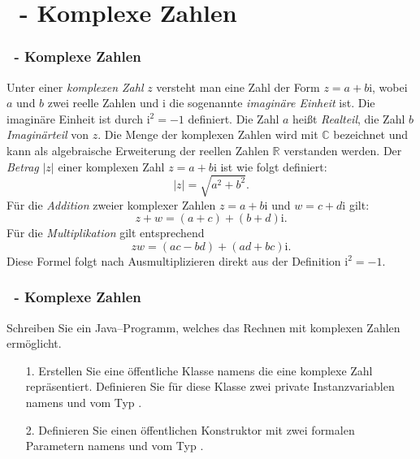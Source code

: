 \def\stitle{\theexercise\ - Komplexe Zahlen}
\section{\stitle}
\begin{frame}%
  \frametitle{\stitle}%

Unter einer \emph{komplexen Zahl} $z$ versteht man eine Zahl der Form $z = a + b\mathrm{i}$, wobei $a$ und $b$ zwei reelle Zahlen und $\mathrm{i}$ die sogenannte \emph{imagin\"are Einheit} ist.
Die imagin\"are Einheit ist durch $\mathrm{i}^2 = -1$ definiert.
Die Zahl $a$ hei\ss t \emph{Realteil}, die Zahl $b$ \emph{Imagin\"arteil} von $z$.
Die Menge der komplexen Zahlen wird mit $\mathbb{C}$ bezeichnet und kann als algebraische Erweiterung der reellen Zahlen $\mathbb{R}$ verstanden werden.
Der \emph{Betrag} $\lvert z\rvert$ einer komplexen Zahl $z = a + b\mathrm{i}$ ist wie folgt definiert:
\begin{equation*}
\lvert z \rvert = \sqrt{a^2 + b^2}.
\end{equation*}
F\"ur die \emph{Addition} zweier komplexer Zahlen $z = a + b\mathrm{i}$ und $w = c + d\mathrm{i}$ gilt:
\begin{equation*}
z + w =(a+c) + (b+d)\mathrm{i}.
\end{equation*}
F\"ur die \emph{Multiplikation} gilt entsprechend
\begin{equation*}
z w =(ac - bd) + (ad + bc)\mathrm{i}.
\end{equation*}
Diese Formel folgt nach Ausmultiplizieren direkt aus der Definition $\mathrm{i}^2 = -1$.
\end{frame}


\begin{frame}%
  \frametitle{\stitle}%
Schreiben Sie ein Java--Programm, welches das Rechnen mit komplexen Zahlen erm\"oglicht.
\begin{enumerate}
\item[1.]
  Erstellen Sie eine \"offentliche Klasse namens  die eine komplexe Zahl repr\"asentiert.
  Definieren Sie f\"ur diese Klasse zwei private Instanzvariablen namens  und  vom Typ .
\item[2.]
  Definieren Sie einen \"offentlichen Konstruktor mit zwei formalen Parametern namens  und  vom Typ .
\end{enumerate}
\pause

\end{frame}


